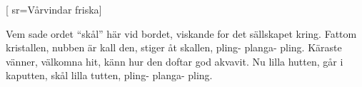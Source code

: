 [ 							
	sr={Vårvindar friska}]		
	
\beginverse*						
Vem sade ordet ``skål'' här vid bordet,
viskande for det sällskapet kring.
Fattom kristallen, nubben är kall den,
stiger åt skallen, pling- planga- pling.
Käraste vänner, välkomna hit,
känn hur den doftar god akvavit.
Nu lilla hutten, går i kaputten,
skål lilla tutten, pling- planga- pling.
\endverse										
\endsong		
